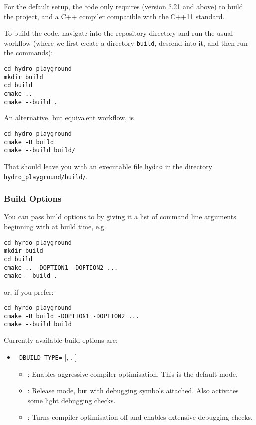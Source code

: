 For the default setup, the code only requires \cmake (version 3.21 and
above) to build the project, and a C++ compiler compatible with the C++11
standard.

To build the code, navigate into the repository directory and run the usual
\cmake workflow (where we first create a directory \verb|build|, descend
into it, and then run the \cmake commands):

\begin{lstlisting}
cd hydro_playground
mkdir build
cd build
cmake ..
cmake --build .
\end{lstlisting}

An alternative, but equivalent workflow, is

\begin{lstlisting}
cd hydro_playground
cmake -B build
cmake --build build/
\end{lstlisting}


That should leave you with an executable file \verb|hydro| in the directory
\verb|hydro_playground/build/|.







\subsubsection{Build Options}


You can pass build options to \cmake by giving it a list of command line
arguments beginning with  at build time, e.g.

\begin{lstlisting}
cd hyrdo_playground
mkdir build
cd build
cmake .. -DOPTION1 -DOPTION2 ...
cmake --build .
\end{lstlisting}

or, if you prefer:

\begin{lstlisting}
cd hyrdo_playground
cmake -B build -DOPTION1 -DOPTION2 ...
cmake --build build
\end{lstlisting}


Currently available build options are:

\begin{itemize}
\item \verb|-DBUILD_TYPE=| [, , ]
    \begin{itemize}
        \item  {}: Enables aggressive compiler optimisation. This
                is the default mode.
        \item  {}: Release mode, but with debugging symbols
                attached. Also activates some light debugging checks.
        \item  {}: Turns compiler optimisation off and enables
                extensive debugging checks.
    \end{itemize}
\end{itemize}


